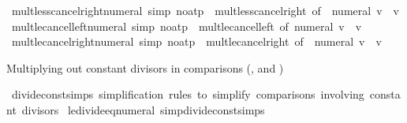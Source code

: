 \begin{isabellebody}
\isamarkupfalse%
\ mult{\isacharunderscore}{\kern0pt}less{\isacharunderscore}{\kern0pt}cancel{\isacharunderscore}{\kern0pt}right{\isacharunderscore}{\kern0pt}numeral\ {\isacharbrackleft}{\kern0pt}simp{\isacharcomma}{\kern0pt}\ no{\isacharunderscore}{\kern0pt}atp{\isacharbrackright}{\kern0pt}\ {\isacharequal}{\kern0pt}\ mult{\isacharunderscore}{\kern0pt}less{\isacharunderscore}{\kern0pt}cancel{\isacharunderscore}{\kern0pt}right\ {\isacharbrackleft}{\kern0pt}of\ {\isacharunderscore}{\kern0pt}\ {\isachardoublequoteopen}numeral\ v{\isachardoublequoteclose}{\isacharbrackright}{\kern0pt}\ \ v\isanewline
{}\isamarkupfalse%
\ mult{\isacharunderscore}{\kern0pt}le{\isacharunderscore}{\kern0pt}cancel{\isacharunderscore}{\kern0pt}left{\isacharunderscore}{\kern0pt}numeral\ {\isacharbrackleft}{\kern0pt}simp{\isacharcomma}{\kern0pt}\ no{\isacharunderscore}{\kern0pt}atp{\isacharbrackright}{\kern0pt}\ {\isacharequal}{\kern0pt}\ mult{\isacharunderscore}{\kern0pt}le{\isacharunderscore}{\kern0pt}cancel{\isacharunderscore}{\kern0pt}left\ {\isacharbrackleft}{\kern0pt}of\ {\isachardoublequoteopen}numeral\ v{\isachardoublequoteclose}{\isacharbrackright}{\kern0pt}\ \ v\isanewline
{}\isamarkupfalse%
\ mult{\isacharunderscore}{\kern0pt}le{\isacharunderscore}{\kern0pt}cancel{\isacharunderscore}{\kern0pt}right{\isacharunderscore}{\kern0pt}numeral\ {\isacharbrackleft}{\kern0pt}simp{\isacharcomma}{\kern0pt}\ no{\isacharunderscore}{\kern0pt}atp{\isacharbrackright}{\kern0pt}\ {\isacharequal}{\kern0pt}\ mult{\isacharunderscore}{\kern0pt}le{\isacharunderscore}{\kern0pt}cancel{\isacharunderscore}{\kern0pt}right\ {\isacharbrackleft}{\kern0pt}of\ {\isacharunderscore}{\kern0pt}\ {\isachardoublequoteopen}numeral\ v{\isachardoublequoteclose}{\isacharbrackright}{\kern0pt}\ \ v%
\begin{isamarkuptext}%
Multiplying out constant divisors in comparisons (\isa{{\isacharless}{\kern0pt}}, \isa{{\isasymle}} and \isa{{\isacharequal}{\kern0pt}})%
\end{isamarkuptext}\isamarkuptrue%
\isamarkupfalse%
\ divide{\isacharunderscore}{\kern0pt}const{\isacharunderscore}{\kern0pt}simps\ {\isachardoublequoteopen}simplification\ rules\ to\ simplify\ comparisons\ involving\ constant\ divisors{\isachardoublequoteclose}\isanewline
\isanewline
{}\isamarkupfalse%
\ le{\isacharunderscore}{\kern0pt}divide{\isacharunderscore}{\kern0pt}eq{\isacharunderscore}{\kern0pt}numeral{}\ {\isacharbrackleft}{\kern0pt}simp{\isacharcomma}{\kern0pt}divide{\isacharunderscore}{\kern0pt}const{\isacharunderscore}{\kern0pt}simps{\isacharbrackright}{\kern0pt}\ {\isacharequal}{\kern0pt}\isanewline

\end{isabellebody}
